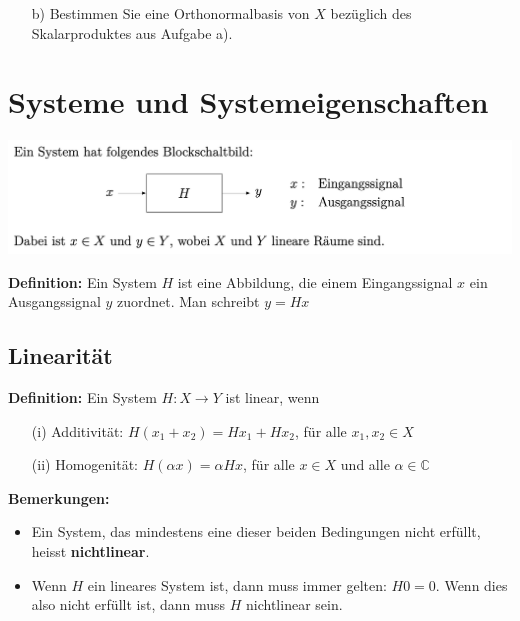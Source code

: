 \documentclass[11pt]{article}
\begin{document}


\pagebreak

\begin{itemize}
    \item[b)] Bestimmen Sie eine Orthonormalbasis von $X$ bezüglich des Skalarproduktes aus Aufgabe a).
\end{itemize}

\vfill \null
\pagebreak

\section*{Systeme und Systemeigenschaften}
\vspace*{-0.5cm}
\hspace{-0.3cm}
\includegraphics[width=0.95\linewidth]{docimgs/System_Blockschaltbild.png}

\textbf{Definition:} Ein System $H$ ist eine Abbildung, die einem Eingangssignal $x$ ein Ausgangssignal $y$ zuordnet. Man schreibt $y = Hx$

\subsection*{Linearität}
\vspace*{-0.5cm}
\textbf{Definition:} Ein System $H:X \to Y$ ist linear, wenn 
\vspace*{-0.5cm}
\begin{itemize}
    \item[(i)] Additivität: $H(x_1 + x_2) = Hx_1 + Hx_2$, für alle $x_1,x_2 \in X$
    \item[(ii)] Homogenität: $H(\alpha x) = \alpha H x$, für alle $x\in X$ und alle $\alpha \in \mathbb{C}$
\end{itemize}
\textbf{Bemerkungen:}
\vspace*{-0.5cm}
\begin{itemize}
    \item Ein System, das mindestens eine dieser beiden Bedingungen nicht erfüllt, heisst \textbf{nichtlinear}.
    \item Wenn $H$ ein lineares System ist, dann muss immer gelten: $H0 = 0$. Wenn dies also nicht erfüllt ist, dann muss $H$ nichtlinear sein.
\end{itemize}
\end{document}

